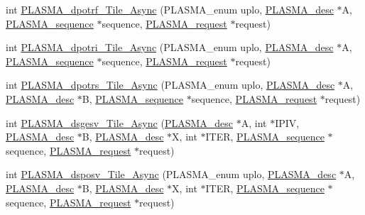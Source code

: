 \begin{DoxyCompactItemize}
int \hyperlink{group__double__Tile__Async_ga08d3116565278891af76dc44d5885e20_ga08d3116565278891af76dc44d5885e20}{P\+L\+A\+S\+M\+A\+\_\+dpotrf\+\_\+\+Tile\+\_\+\+Async} (P\+L\+A\+S\+M\+A\+\_\+enum uplo, \hyperlink{structplasma__desc__t}{P\+L\+A\+S\+M\+A\+\_\+desc} $\ast$A, \hyperlink{structplasma__sequence__t}{P\+L\+A\+S\+M\+A\+\_\+sequence} $\ast$sequence, \hyperlink{structplasma__request__t}{P\+L\+A\+S\+M\+A\+\_\+request} $\ast$request)
\item 
int \hyperlink{group__double__Tile__Async_gafa039c73de9ebc0ec6308256b773a05a_gafa039c73de9ebc0ec6308256b773a05a}{P\+L\+A\+S\+M\+A\+\_\+dpotri\+\_\+\+Tile\+\_\+\+Async} (P\+L\+A\+S\+M\+A\+\_\+enum uplo, \hyperlink{structplasma__desc__t}{P\+L\+A\+S\+M\+A\+\_\+desc} $\ast$A, \hyperlink{structplasma__sequence__t}{P\+L\+A\+S\+M\+A\+\_\+sequence} $\ast$sequence, \hyperlink{structplasma__request__t}{P\+L\+A\+S\+M\+A\+\_\+request} $\ast$request)
\item 
int \hyperlink{group__double__Tile__Async_ga6c178b2f39fa657b2a49f02850381e93_ga6c178b2f39fa657b2a49f02850381e93}{P\+L\+A\+S\+M\+A\+\_\+dpotrs\+\_\+\+Tile\+\_\+\+Async} (P\+L\+A\+S\+M\+A\+\_\+enum uplo, \hyperlink{structplasma__desc__t}{P\+L\+A\+S\+M\+A\+\_\+desc} $\ast$A, \hyperlink{structplasma__desc__t}{P\+L\+A\+S\+M\+A\+\_\+desc} $\ast$B, \hyperlink{structplasma__sequence__t}{P\+L\+A\+S\+M\+A\+\_\+sequence} $\ast$sequence, \hyperlink{structplasma__request__t}{P\+L\+A\+S\+M\+A\+\_\+request} $\ast$request)
\item 
int \hyperlink{group__double__Tile__Async_gabb25d0ea26158fa5ba5fc61e6dd05505_gabb25d0ea26158fa5ba5fc61e6dd05505}{P\+L\+A\+S\+M\+A\+\_\+dsgesv\+\_\+\+Tile\+\_\+\+Async} (\hyperlink{structplasma__desc__t}{P\+L\+A\+S\+M\+A\+\_\+desc} $\ast$A, int $\ast$I\+P\+I\+V, \hyperlink{structplasma__desc__t}{P\+L\+A\+S\+M\+A\+\_\+desc} $\ast$B, \hyperlink{structplasma__desc__t}{P\+L\+A\+S\+M\+A\+\_\+desc} $\ast$X, int $\ast$I\+T\+E\+R, \hyperlink{structplasma__sequence__t}{P\+L\+A\+S\+M\+A\+\_\+sequence} $\ast$sequence, \hyperlink{structplasma__request__t}{P\+L\+A\+S\+M\+A\+\_\+request} $\ast$request)
\item 
int \hyperlink{group__double__Tile__Async_ga0842cc9b88abf281e24547653d18b2a9_ga0842cc9b88abf281e24547653d18b2a9}{P\+L\+A\+S\+M\+A\+\_\+dsposv\+\_\+\+Tile\+\_\+\+Async} (P\+L\+A\+S\+M\+A\+\_\+enum uplo, \hyperlink{structplasma__desc__t}{P\+L\+A\+S\+M\+A\+\_\+desc} $\ast$A, \hyperlink{structplasma__desc__t}{P\+L\+A\+S\+M\+A\+\_\+desc} $\ast$B, \hyperlink{structplasma__desc__t}{P\+L\+A\+S\+M\+A\+\_\+desc} $\ast$X, int $\ast$I\+T\+E\+R, \hyperlink{structplasma__sequence__t}{P\+L\+A\+S\+M\+A\+\_\+sequence} $\ast$sequence, \hyperlink{structplasma__request__t}{P\+L\+A\+S\+M\+A\+\_\+request} $\ast$request)

\end{DoxyCompactItemize}
